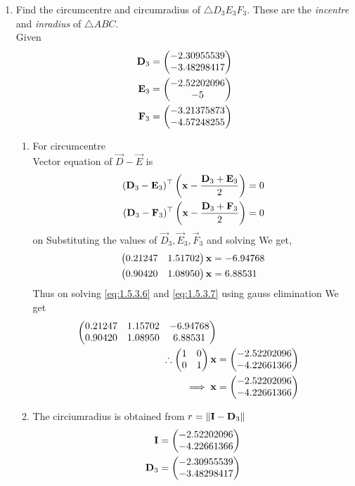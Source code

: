 \documentclass[11pt]{book}
\begin{document}
\begin{enumerate}[label=\thesection.\arabic*.,ref=\thesection.\theenumi]
\item Find the circumcentre and circumradius of $\triangle D_3E_3F_3$.  These are the {\em incentre} and {\em inradius} of $\triangle ABC$. \\
\solution Given 
\begin{align}
    \mathbf{D}_3 &= \begin{pmatrix}-2.30955539  \\ -3.48298417\end{pmatrix} \\
    \mathbf{E}_3 &= \begin{pmatrix}-2.52202096  \\ -5\end{pmatrix} \\
    \mathbf{F}_3 &= \begin{pmatrix}-3.21375873 \\ -4.57248255\end{pmatrix} 
\end{align}
\begin{enumerate}
\item For circumcentre \\
Vector equation of $\vec{D}-\vec{E}$ is
\begin{align}
(\mathbf{D}_3-\mathbf{E}_3)^\top\left( \mathbf{x} - \frac{\mathbf{D}_3+\mathbf{E}_3}{2}\right) = 0 \\
(\mathbf{D}_3-\mathbf{F}_3)^\top\left( \mathbf{x} - \frac{\mathbf{D}_3+\mathbf{F}_3}{2}\right) = 0
\end{align}
on Substituting the values of $\vec{D}_3, \vec{E}_3, \vec{F}_3$ and solving We get,
\begin{align}
     \myvec{0.21247 & 1.51702}\vec{x} &= -6.94768 \label{eq:1.5.3.6} \\
     \myvec{0.90420 & 1.08950}\vec{x} &=6.88531 \label{eq:1.5.3.7}
\end{align}
Thus on solving \eqref{eq:1.5.3.6} and \eqref{eq:1.5.3.7} using gauss elimination We get
\begin{align}
    \begin{pmatrix} 0.21247 & 1.15702 & -6.94768 \\ 0.90420 & 1.08950 & 6.88531\end{pmatrix} \\
    \therefore \begin{pmatrix}1&0\\0&1\end{pmatrix}\mathbf{x} &= \begin{pmatrix}-2.52202096 \\ -4.22661366\end{pmatrix}\\
\implies \mathbf{x}&=\begin{pmatrix}-2.52202096 \\ -4.22661366\end{pmatrix}
\end{align}
\item The circiumradius is obtained from  $ r=\left\lVert\mathbf{I}-\mathbf{D}_3\right\rVert$
   \begin{align}
       \vec{I} &= \myvec{-2.52202096 \\ -4.22661366} \\
       \vec{D}_3 &= \myvec{-2.30955539  \\ -3.48298417} \\

\end{align}
\end{enumerate}
\end{enumerate}
\end{document}
